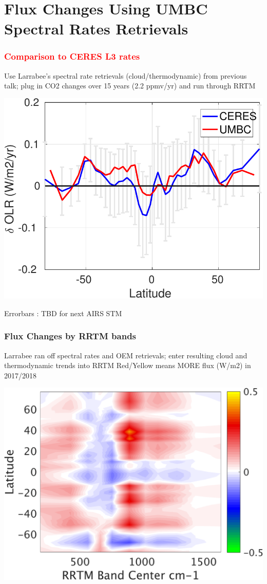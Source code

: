 \documentclass[10pt,t]{beamer}
\begin{document}
\section{Flux Changes Using UMBC Spectral Rates Retrievals}
\begin{frame}
  \frametitle{\textcolor{red}{\bf Comparison to CERES L3 rates}}
  Use Larrabee's spectral rate retrievals (cloud/thermodynamic) from previous talk;
  plug in CO2 changes over 15 years (2.2 ppmv/yr) and run through RRTM  
  \begin{center}
    \noindent\includegraphics[width=0.625\linewidth]{Figs/umbc_vs_ceres_fluxrates.pdf}
  \end{center}
 Errorbars : TBD for next AIRS STM
\end{frame}

\begin{frame}
  \frametitle{Flux Changes by RRTM bands}
  Larrabee ran off spectral rates and OEM retrievals; enter resulting cloud and thermodynamic trends into RRTM \newline
  Red/Yellow means MORE flux (W/m2) in 2017/2018 \newline
  \begin{center}
    \noindent\includegraphics[width=0.625\linewidth]{Figs/umbc_vs_band_fluxrates.png}
  \end{center}
\end{frame}
\end{document}
